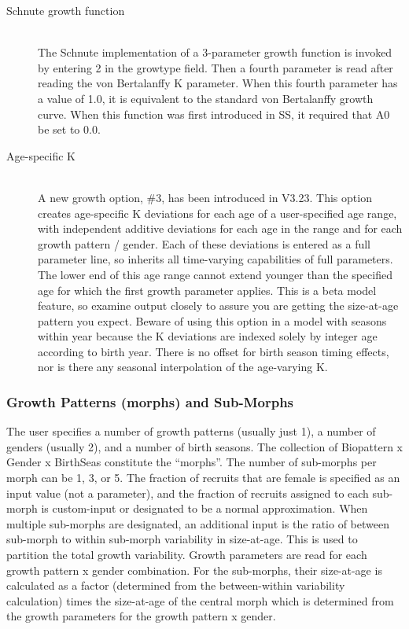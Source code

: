 \begin{description}
	\item[Schnute growth function]\hfil\\
	The Schnute implementation of a 3-parameter growth function is invoked by entering 2 in the grow\textunderscore type field.  Then a fourth parameter is read after reading the von Bertalanffy K parameter.  When this fourth parameter has a value of 1.0, it is equivalent to the standard von Bertalanffy growth curve.  When this function was first introduced in SS, it required that A0 be set to 0.0.
	\item[Age-specific K]\hfil\\
	A new growth option, \#3, has been introduced in V3.23.  This option creates age-specific K deviations for each age of a user-specified age range, with independent additive deviations for each age in the range and for each growth pattern / gender.  Each of these deviations is entered as a full parameter line, so inherits all time-varying capabilities of full parameters.  The lower end of this age range cannot extend younger than the specified age for which the first growth parameter applies.  This is a beta model feature, so examine output closely to assure you are getting the size-at-age pattern you expect.  Beware of using this option in a model with seasons within year because the K deviations are indexed solely by integer age according to birth year.  There is no offset for birth season timing effects, nor is there any seasonal interpolation of the age-varying K.
\end{description}

\subsubsection{Growth Patterns (morphs) and Sub-Morphs}
The user specifies a number of growth patterns (usually just 1), a number of genders (usually 2), and a number of birth seasons.  The collection of Bio\textunderscore pattern x Gender x BirthSeas constitute the “morphs”.  The number of sub-morphs per morph can be 1, 3, or 5.  The fraction of recruits that are female is specified as an input value (not a parameter), and the fraction of recruits assigned to each sub-morph is custom-input or designated to be a normal approximation.  When multiple sub-morphs are designated, an additional input is the ratio of between sub-morph to within sub-morph variability in size-at-age.  This is used to partition the total growth variability.  Growth parameters are read for each growth pattern x gender combination.  For the sub-morphs, their size-at-age is calculated as a factor (determined from the between-within variability calculation) times the size-at-age of the central morph which is determined from the growth parameters for the growth pattern x gender.

